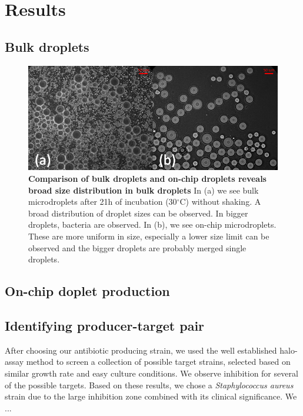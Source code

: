 \chapter{Results}

\section{Bulk droplets}

\begin{figure}
\centering
\includegraphics[width=\linewidth]{graphics/2025_09_28_droplets_fig3.png}
\caption{\textbf{Comparison of bulk droplets and on-chip droplets reveals broad size distribution in bulk droplets } In (a) we see bulk microdroplets after 21h of incubation (30$^\circ$C) without shaking. A broad distribution of droplet sizes can be observed. In bigger droplets, bacteria are observed. In (b), we see on-chip microdroplets. These are more uniform in size, especially a lower size limit can be observed and the bigger droplets are probably merged single droplets.}
\label{fig:results_droplet_bulk_vs_chip}
\end{figure}

\section{On-chip doplet production}

\section{Identifying producer-target pair}
After choosing our antibiotic producing strain, we used the well established halo-assay method to screen a collection of possible target strains, selected based on similar growth rate and easy culture conditions. We observe inhibition for several of the possible targets. Based on these results, we chose a \textit{Staphylococcus aureus} strain due to the large inhibition zone combined with its clinical significance. We ...

